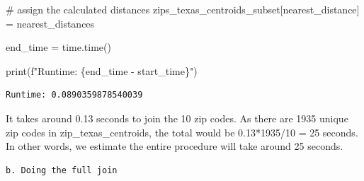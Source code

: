 \documentclass[
  letterpaper,
  DIV=11,
  numbers=noendperiod]{scrartcl}
\newenvironment{Shaded}{\begin{snugshade}}{\end{snugshade}}
\newcommand{\BuiltInTok}[1]{\textcolor[rgb]{0.00,0.23,0.31}{#1}}
\newcommand{\CommentTok}[1]{\textcolor[rgb]{0.37,0.37,0.37}{#1}}
\newcommand{\NormalTok}[1]{\textcolor[rgb]{0.00,0.23,0.31}{#1}}
\newcommand{\OperatorTok}[1]{\textcolor[rgb]{0.37,0.37,0.37}{#1}}
\newcommand{\SpecialCharTok}[1]{\textcolor[rgb]{0.37,0.37,0.37}{#1}}
\newcommand{\SpecialStringTok}[1]{\textcolor[rgb]{0.13,0.47,0.30}{#1}}
\newcommand{\StringTok}[1]{\textcolor[rgb]{0.13,0.47,0.30}{#1}}
\begin{document}
\begin{Shaded}
\begin{Highlighting}[]
\CommentTok{\# assign the calculated distances}
\NormalTok{zips\_texas\_centroids\_subset[}\StringTok{\textquotesingle{}nearest\_distance\textquotesingle{}}\NormalTok{] }\OperatorTok{=}\NormalTok{ nearest\_distances}

\NormalTok{end\_time }\OperatorTok{=}\NormalTok{ time.time()}

\BuiltInTok{print}\NormalTok{(}\SpecialStringTok{f"Runtime: }\SpecialCharTok{\{}\NormalTok{end\_time }\OperatorTok{{-}}\NormalTok{ start\_time}\SpecialCharTok{\}}\SpecialStringTok{"}\NormalTok{)}
\end{Highlighting}
\end{Shaded}

\begin{verbatim}
Runtime: 0.0890359878540039
\end{verbatim}

It takes around 0.13 seconds to join the 10 zip codes. As there are 1935
unique zip codes in zip\_texas\_centroids, the total would be
0.13*1935/10 = 25 seconds. In other words, we estimate the entire
procedure will take around 25 seconds.

\begin{verbatim}
b. Doing the full join
\end{verbatim}
\end{document}
